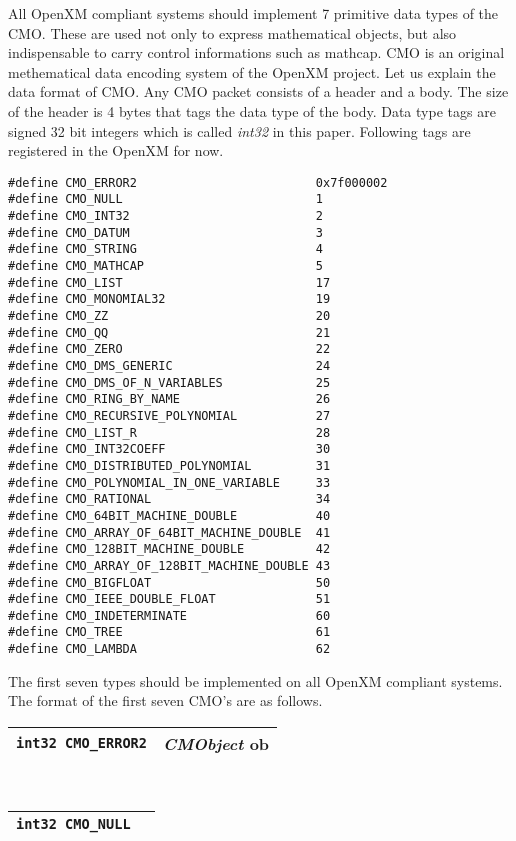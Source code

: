 All OpenXM compliant systems should implement 7 primitive data types
of the CMO.
These are used not only to express mathematical objects, but also
indispensable to carry control informations such as mathcap.
CMO is an original methematical data encoding system of the OpenXM project.
Let us explain the data format of CMO.
Any CMO packet consists of a header and a body.
The size of the header is 4 bytes that tags the data type of the body.
Data type tags are signed 32 bit integers which is called {\sl int32} in this
paper.
Following tags are registered in the OpenXM for now.
\begin{verbatim}
#define CMO_ERROR2                         0x7f000002
#define CMO_NULL                           1
#define CMO_INT32                          2
#define CMO_DATUM                          3
#define CMO_STRING                         4
#define CMO_MATHCAP                        5
#define CMO_LIST                           17
#define CMO_MONOMIAL32                     19
#define CMO_ZZ                             20
#define CMO_QQ                             21
#define CMO_ZERO                           22
#define CMO_DMS_GENERIC                    24
#define CMO_DMS_OF_N_VARIABLES             25
#define CMO_RING_BY_NAME                   26
#define CMO_RECURSIVE_POLYNOMIAL           27
#define CMO_LIST_R                         28
#define CMO_INT32COEFF                     30
#define CMO_DISTRIBUTED_POLYNOMIAL         31
#define CMO_POLYNOMIAL_IN_ONE_VARIABLE     33
#define CMO_RATIONAL                       34
#define CMO_64BIT_MACHINE_DOUBLE           40
#define CMO_ARRAY_OF_64BIT_MACHINE_DOUBLE  41
#define CMO_128BIT_MACHINE_DOUBLE          42
#define CMO_ARRAY_OF_128BIT_MACHINE_DOUBLE 43
#define CMO_BIGFLOAT                       50
#define CMO_IEEE_DOUBLE_FLOAT              51
#define CMO_INDETERMINATE                  60
#define CMO_TREE                           61
#define CMO_LAMBDA                         62
\end{verbatim}
The first seven types should be implemented on all OpenXM compliant systems.
The format of the first seven CMO's are as follows. \\
\begin{tabular}{|c|c|}
\hline
{\tt int32 CMO\_ERROR2} & {\sl CMObject} {\rm ob} \\ 
\hline
\end{tabular} \\
\begin{tabular}{|c|c|}
\hline
{\tt int32 CMO\_NULL}  \\ 
\hline
\end{tabular} \\
